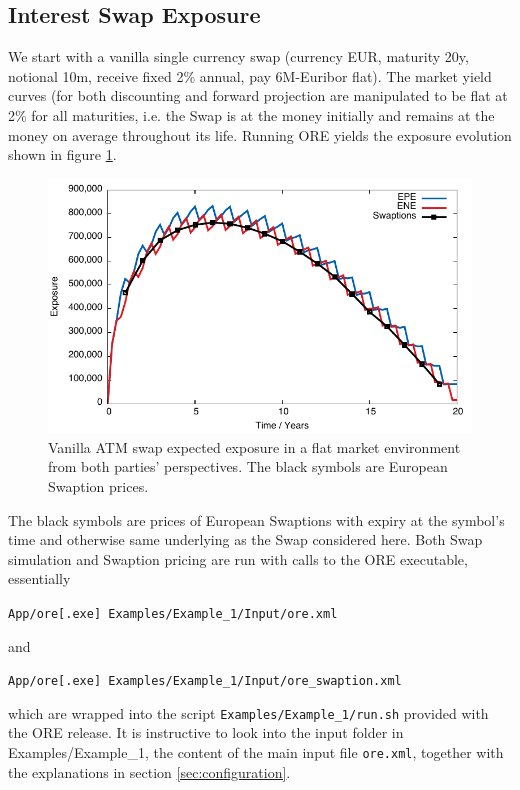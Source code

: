 \documentclass[12pt, a4paper]{article}
\begin{document}
\subsection{Interest Swap Exposure}

We start with a vanilla single currency swap (currency EUR, maturity 20y, notional 10m, receive fixed 2\% annual, pay 6M-Euribor flat). The market yield curves (for both discounting and forward projection are manipulated to be flat at 2\% for all maturities, i.e. the Swap is at the money initially and remains at the money on average throughout its life. Running ORE yields the exposure evolution shown in figure \ref{fig_1}. 
\begin{figure}[hbt]
\begin{center}
\includegraphics[scale=1.0]{example_swap_1.pdf}
\end{center}
\caption{Vanilla ATM swap expected exposure in a flat market environment from both parties' perspectives. The black symbols are European Swaption prices.}
\label{fig_1}
\end{figure}
The black symbols are prices of European Swaptions with expiry at the symbol's time and otherwise same underlying as the Swap considered here. Both Swap simulation and Swaption pricing are run with calls to the ORE executable, essentially 

\medskip
\centerline{\tt App/ore[.exe] Examples/Example\_1/Input/ore.xml } 
\medskip
and

\medskip
\centerline{\tt App/ore[.exe] Examples/Example\_1/Input/ore\_swaption.xml }
\medskip
which are wrapped into the script {\tt Examples/Example\_1/run.sh}
provided with the ORE release.
It is instructive to look into the input folder in Examples/Example\_1, the content of the main input file {\tt ore.xml}, together with the explanations in section \ref{sec:configuration}.
\end{document}
